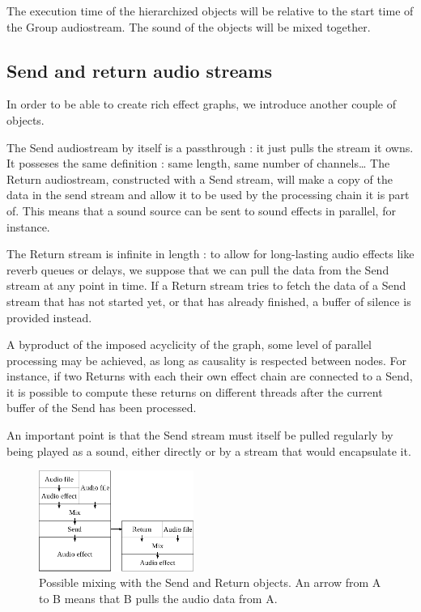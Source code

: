 \documentclass{article}
\begin{document}
The execution time of the hierarchized objects will be relative to the start time of the Group audiostream.
The sound of the objects will be mixed together.

\subsection{Send and return audio streams}
In order to be able to create rich effect graphs, we introduce another couple of objects.

The Send audiostream by itself is a passthrough : it just pulls the stream it owns.
It posseses the same definition : same length, same number of channels\dots
The Return audiostream, constructed with a Send stream, will make a copy of the data in 
the send stream and allow it to be used by the processing chain it is part of.
This means that a sound source can be sent to sound effects in parallel, for instance.

The Return stream is infinite in length : to allow for long-lasting audio effects 
like reverb queues or delays, we suppose that we can pull the data from the Send stream at any point in time.
If a Return stream tries to fetch the data of a Send stream that has not started yet, or that has already finished, a buffer of silence is provided instead.

A byproduct of the imposed acyclicity of the graph, some level of parallel processing may be achieved, as long as causality is respected between nodes. 
For instance, if two Returns with each their own effect chain are connected to a Send, it is possible to compute these returns on different threads after the current buffer of the Send has been processed.

An important point is that the Send stream must itself be pulled regularly by being played as a sound, either directly or by a stream that would encapsulate it.

\begin{figure}
	\centering
	\includegraphics[width=0.45\textwidth]{figures/graph2.eps}
	\caption{Possible mixing with the Send and Return objects. An arrow from A to B means that B pulls the audio data from A.}
	\label{fig.mixsendreturn}
\end{figure}
\end{document}
